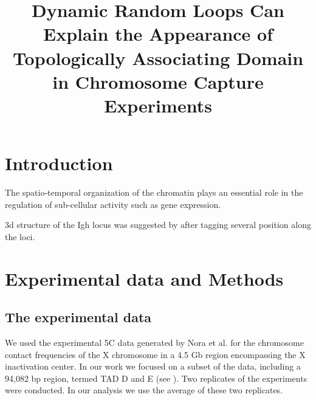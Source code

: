 \documentclass[12pt]{paper}
\begin{document}
\title{Dynamic Random Loops Can Explain the Appearance of Topologically Associating Domain in Chromosome Capture Experiments}
\maketitle

\section{Introduction}\label{section_introduction}

The spatio-temporal organization of the chromatin plays an essential role in the regulation of sub-cellular activity such as gene expression\cite{cremer2001chromosome}. 




3d structure of the Igh locus was suggested by \cite{jhunjhunwala20083d} after tagging several position along the loci. 


\section{Experimental data and Methods}\label{section_experimentalDataAndMethods}

\subsection{The experimental data}\label{subsection_theExperimentalData}
We used the experimental 5C data generated by Nora et al.\cite{Nora2012} for the chromosome contact frequencies of the X chromosome in a 4.5 Gb region encompassing the X inactivation center. In our work we focused on a subset of the data, including a 94,082 bp region, termed TAD D and E (see \cite{Nora2012}). 
Two replicates of the experiments were conducted. In our analysis we use the average of these two replicates. 
\end{document}
